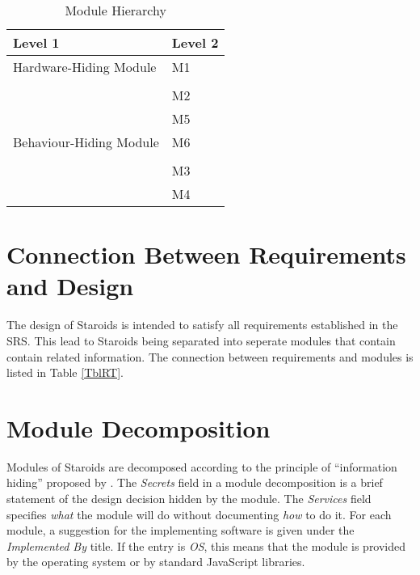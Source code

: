 \documentclass[12pt, titlepage]{article}
\begin{document}
\begin{table}[h!]
\centering
\begin{tabular}{p{} p{}}
\toprule
\textbf{Level 1} & \textbf{Level 2}\\
\midrule

{Hardware-Hiding Module} & M1 \\
\midrule

\multirow{7}{0.3\textwidth}{Behaviour-Hiding Module} & \\
& M2 \\
& M5 \\
& M6 \\
\midrule

\multirow{3}{0.3\textwidth}{Software Decision Module} & \\
& M3\\
& M4\\
\bottomrule

\end{tabular}
\caption{Module Hierarchy}
\label{TblMH}
\end{table}

\section{Connection Between Requirements and Design} \label{SecConnection}

The design of Staroids is intended to satisfy all requirements established in the SRS. This lead to Staroids being separated into seperate modules that contain contain related information. The connection between requirements and modules is listed in Table \ref{TblRT}.

\section{Module Decomposition} \label{SecMD}

Modules of Staroids are decomposed according to the principle of ``information hiding'' proposed by \citet{ParnasEtAl1984}. The \emph{Secrets} field in a module decomposition is a brief statement of the design decision hidden by the module. The \emph{Services} field specifies \emph{what} the module will do without documenting \emph{how} to do it. For each module, a suggestion for the implementing software is given under the \emph{Implemented By} title. If the entry is \emph{OS}, this means that the module is provided by the operating system or by standard JavaScript libraries.
\end{document}
